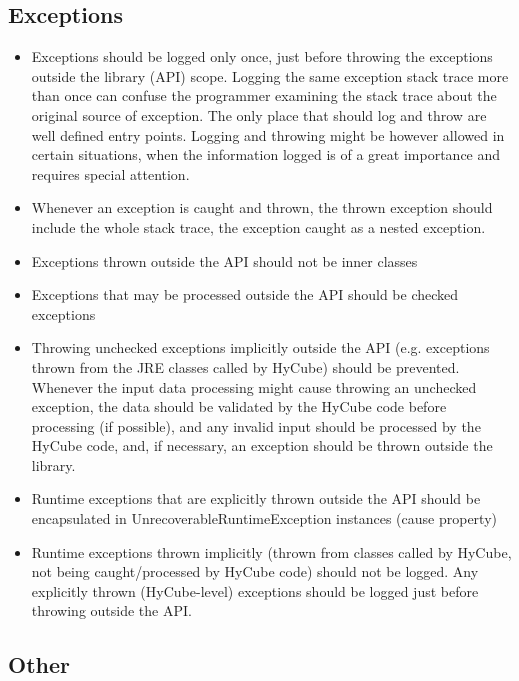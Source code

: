 \subsection{Exceptions}

\begin{itemize}
	\renewcommand{\labelitemi}{$\bullet$}
	\item Exceptions should be logged only once, just before throwing the exceptions outside the library (API) scope. Logging the same exception stack trace more than once can confuse the programmer examining the stack trace about the original source of exception. The only place that should log and throw are well defined entry points. Logging and throwing might be however allowed in certain situations, when the information logged is of a great importance and requires special attention.
	\item Whenever an exception is caught and thrown, the thrown exception should include the whole stack trace, the exception caught as a nested exception.
	\item Exceptions thrown outside the API should not be inner classes
	\item Exceptions that may be processed outside the API should be checked exceptions
	\item Throwing unchecked exceptions implicitly outside the API (e.g. exceptions thrown from the JRE classes called by HyCube) should be prevented. Whenever the input data processing might cause throwing an unchecked exception, the data should be validated by the HyCube code before processing (if possible), and any invalid input should be processed by the HyCube code, and, if necessary, an exception should be thrown outside the library.
	\item Runtime exceptions that are explicitly thrown outside the API should be encapsulated in UnrecoverableRuntimeException instances (cause property)
	\item Runtime exceptions thrown implicitly (thrown from classes called by HyCube, not being caught/processed by HyCube code) should not be logged. Any explicitly thrown (HyCube-level) exceptions should be logged just before throwing outside the API.
\end{itemize}






\subsection{Other}

